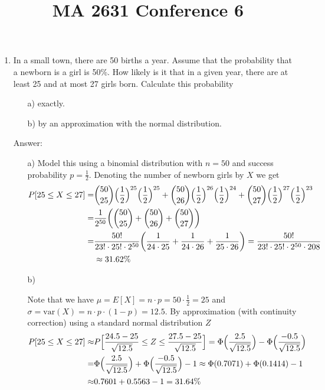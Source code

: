\documentclass{article}
\title{MA 2631 Conference 6}
\begin{document}
\maketitle



\begin{enumerate}

\item

In a small town, there are 50 births a year. Assume that the probability that a newborn is a girl is 50\%. How likely is it that in a given year, there are at least 25 and at most 27 girls born. Calculate this probability
\begin{itemize}
	\item[a)] exactly.
	\item[b)] by an approximation with the normal distribution.
\end{itemize}

Answer:

\begin{itemize}
	
	
	\item[a)] Model this using a binomial distribution with 	$n = 50$ and success probability $p=\frac{1}{2}$. Denoting the number of newborn girls by $X$ we get
	\begin{align*}
	P[25 \leq X \leq 27] = &\binom{50}{25}\Bigl(\frac{1}{2}\Bigr)^{25} \Bigl(\frac{1}{2}\Bigr)^{25} + \binom{50}{26}\Bigl(\frac{1}{2}\Bigr)^{26} \Bigl(\frac{1}{2}\Bigr)^{24} + \binom{50}{27}\Bigl(\frac{1}{2}\Bigr)^{27} \Bigl(\frac{1}{2}\Bigr)^{23} \\
	= & \frac{1}{2^{50}} \biggl( \binom{50}{25} + \binom{50}{26} + \binom{50}{27}\biggr)\\ \
	= & \frac{50!}{23! \cdot 25! \cdot 2^{50}} \biggl( \frac{1}{24\cdot25} + \frac{1}{24\cdot 26} + \frac{1}{25\cdot26}\biggr) =  \frac{50!}{23! \cdot25! \cdot 2^{50} \cdot 208} \\
	&\approx 31.62\%
	\end{align*}
	
	\item[b)]
	
	Note that we have $\mu = E[X] = n \cdot p = 50 \cdot \frac{1}{2} = 25$ and $\sigma = \text{var}(X) = n \cdot p \cdot (1-p) = 12.5$. By approximation (with continuity correction) using a standard normal distribution $Z$
	\begin{align*}
	P[25 \leq X \leq 27] \approx &P\Bigl[ \frac{24.5 - 25}{\sqrt{12.5}} \leq Z \leq \frac{27.5 - 25}{\sqrt{12.5}}\Bigr] = \Phi\Bigl(\frac{2.5}{\sqrt{12.5}}\Bigr) - \Phi\Bigl(\frac{-0.5}{\sqrt{12.5}}\Bigr)\\
	=& \Phi\Bigl(\frac{2.5}{\sqrt{12.5}}\Bigr) + \Phi\Bigl(\frac{-0.5}{\sqrt{12.5}}\Bigr) -1 \approx \Phi(0.7071) + \Phi(0.1414) - 1 \\
	\approx & 0.7601 + 0.5563 -1 = 31.64\%
	\end{align*}	
	

\end{itemize}
\end{enumerate}
\end{document}

